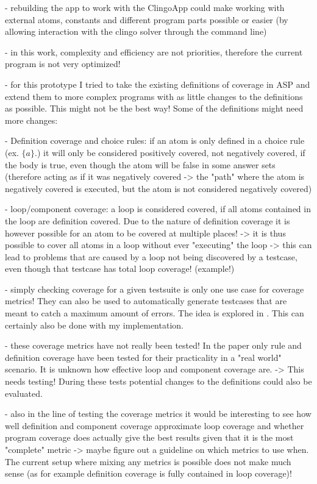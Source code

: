 - rebuilding the app to work with the ClingoApp could make working with external atoms, constants and different program parts possible 
or easier (by allowing interaction with the clingo solver through the command line)

- in this work, complexity and efficiency are not priorities, therefore the current program is not very optimized!

- for this prototype I tried to take the existing definitions of coverage in ASP and extend them to more complex programs with as little 
changes to the definitions as possible. This might not be the best way! Some of the definitions might need more changes:

    - Definition coverage and choice rules: if an atom is only defined in a choice rule (ex. $\{a\}.$) it will only be considered positively 
    covered, not negatively covered, if the body is true, even though the atom will be false in some answer sets (therefore acting as if 
    it was negatively covered -> the "path" where the atom is negatively covered is executed, but the atom is not considered negatively covered)

    - loop/component coverage: a loop is considered covered, if all atoms contained in the loop are definition covered. Due to the nature 
    of definition coverage it is however possible for an atom to be covered at multiple places! -> it is thus possible to cover all 
    atoms in a loop without ever "executing" the loop -> this can lead to problems that are caused by a loop not being discovered by 
    a testcase, even though that testcase has total loop coverage! (example!)

- simply checking coverage for a given testsuite is only one use case for coverage metrics! They can also be used to automatically generate 
testcases that are meant to catch a maximum amount of errors. The idea is explored in \cite{Jan+11}. This can certainly also be done with 
my implementation.

- these coverage metrics have not really been tested! In the paper \cite{Jan+11} only rule and definition coverage have been tested for 
their practicality in a "real world" scenario. It is unknown how effective loop and component coverage are. -> This needs testing! 
During these tests potential changes to the definitions could also be evaluated.

- also in the line of testing the coverage metrics it would be interesting to see how well definition and component coverage approximate 
loop coverage and whether program coverage does actually give the best results given that it is the most "complete" metric
-> maybe figure out a guideline on which metrics to use when. The current setup where mixing any metrics is possible does not make much 
sense (as for example definition coverage is fully contained in loop coverage)!


